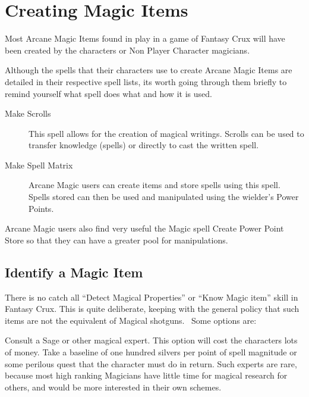 %


\section{Creating Magic Items}
Most Arcane Magic Items found in play in a game of Fantasy Crux will have been created by the characters or Non Player Character magicians.

Although the spells that their characters use to create Arcane Magic Items are detailed in their respective spell lists, its worth going through them briefly to remind yourself what spell does what and how it is used.

\begin{description}
\item [Make Scrolls] This spell allows for the creation of magical writings. Scrolls can be used to transfer knowledge (spells) or directly to cast the written spell.
\item [Make Spell Matrix] Arcane Magic users can create items and store spells using this spell. Spells stored can then be used and manipulated using the wielder's Power Points.
\end{description}

Arcane Magic users also find very useful the Magic spell Create Power Point Store so that they can have a greater pool for manipulations.

\subsection{Identify a Magic Item}
There is no catch all “Detect Magical Properties” or “Know Magic item” skill in Fantasy Crux. This is quite deliberate, keeping with the general policy that such items are not the equivalent of Magical shotguns.  Some options are:

Consult a Sage or other magical expert. This option will cost the characters lots of money. Take a baseline of one hundred silvers per point of spell magnitude or some perilous quest that the character must do in return. Such experts are rare, because most high ranking Magicians have little time for magical research for others, and would be more interested in their own schemes. 

